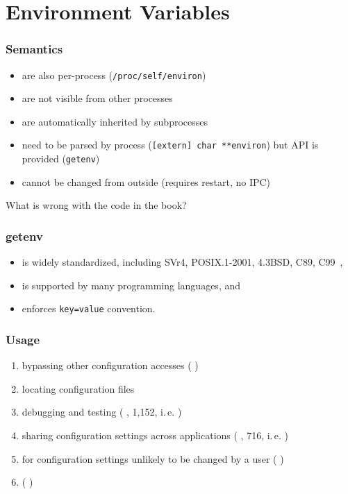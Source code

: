 \documentclass{beamer}
\begin{document}
\section{Environment Variables}

\begin{frame}
	\frametitle{Semantics}
	\begin{itemize}
	\item are also per-process (\texttt{/proc/self/environ})
	\item are not visible from other processes
	\item are automatically inherited by subprocesses
	\item need to be parsed by process (\texttt{[extern] char **environ}) but API is provided (\texttt{getenv})
	\item cannot be changed from outside (requires restart, no IPC)
	\end{itemize}
\end{frame}

\begin{assignment}
	\begin{task}
	What is wrong with the code in the book?
	\end{task}
\end{assignment}

\begin{frame}
	\frametitle{getenv}
	\begin{itemize}
	\item is widely standardized, including SVr4, POSIX.1-2001, 4.3BSD, C89, C99~\cite{man2017getenv},
	\item is supported by many programming languages, and
	\item enforces \texttt{key=value} convention.
	\end{itemize}
\end{frame}

\begin{frame}
	\frametitle{Usage}
	\begin{enumerate}
	\item bypassing other configuration accesses (\methodQuestion{} )
	\item locating configuration files
	\item debugging and testing (\methodQuestion{} , \methodSource{} 1,152, i.\,e. )
	\item sharing configuration settings across applications (\methodQuestion{} , \methodSource{} 716, i.\,e. )
	\item for configuration settings unlikely to be changed by a user (\methodQuestion{} )
	\item {} (\methodQuestion{} )
	\end{enumerate}
\end{frame}
\end{document}
